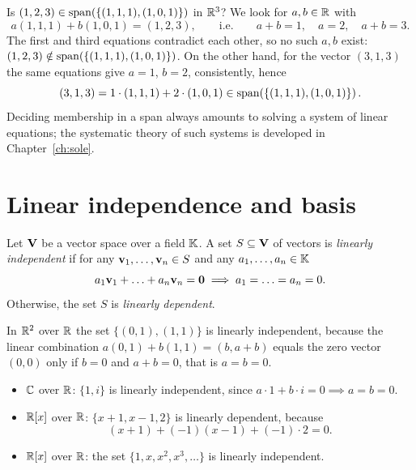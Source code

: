 \begin{example}
Is $(1,2,3)\in\operatorname{span}\!\left(\{(1,1,1),(1,0,1)\}\right)$ in $\mathbb{R}^3$? We look for $a,b\in\mathbb{R}$ with
\[
a(1,1,1)+b(1,0,1) = (1,2,3), \qquad\text{i.e.}\qquad a+b = 1,\quad a = 2,\quad a+b = 3.
\]
The first and third equations contradict each other, so no such $a,b$ exist:
$(1,2,3)\notin \operatorname{span}\!\left(\{(1,1,1),(1,0,1)\}\right)$. On the other hand, for the vector $(3,1,3)$ the same equations
give $a = 1$, $b = 2$, consistently, hence
\[
(3,1,3) = 1\cdot (1,1,1)+2\cdot (1,0,1) \in \operatorname{span}\!\left(\{(1,1,1),(1,0,1)\}\right).
\]
Deciding membership in a span always amounts to solving a system of linear equations; the systematic theory
of such systems is developed in Chapter~\ref{ch:sole}.
\end{example}

\section{Linear independence and basis}

\begin{definition}
Let $\mathbf{V}$ be a vector space over a field $\mathbb{K}$. A set $S\subseteq \mathbf{V}$ of vectors is \emph{linearly independent}
if for any $\mathbf{v}_1,\ldots,\mathbf{v}_n \in S$ and any $a_1,\ldots,a_n\in \mathbb{K}$
\[
a_1\mathbf{v}_1+\ldots+a_n\mathbf{v}_n = \mathbf{0} \implies a_1=\ldots =a_n=0.
\]
Otherwise, the set $S$ is \emph{linearly dependent}.
\end{definition}

\begin{example}
In $\mathbb{R}^2$ over $\mathbb{R}$ the set $\{(0,1),(1,1)\}$ is linearly independent, because the linear combination
$a(0,1)+b(1,1) = (b,a+b)$ equals the zero vector $(0,0)$ only if $b=0$ and $a+b=0$, that is $a=b=0$.
\end{example}

\begin{example}
\hfill
\begin{itemize}
\item $\mathbb{C}$ over $\mathbb{R}$: $\{1,i\}$ is linearly independent, since $a\cdot 1 + b\cdot i = 0\implies a=b=0$.
\item $\mathbb{R}[x]$ over $\mathbb{R}$: $\{x+1, x-1, 2\}$ is linearly dependent, because
\[
(x+1)+(-1)(x-1)+(-1)\cdot 2 = 0.
\]
\item $\mathbb{R}[x]$ over $\mathbb{R}$: the set $\{1,x,x^2,x^3,\ldots \}$ is linearly independent.
\end{itemize}
\end{example}

